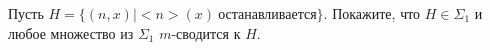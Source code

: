 Пусть $H = \{(n, x) \mid {<}n{>}(x)~\text{останавливается}\}$. Покажите, что $H \in \Sigma_1$ и любое множество из $\Sigma_1$
$m$-сводится к $H$.